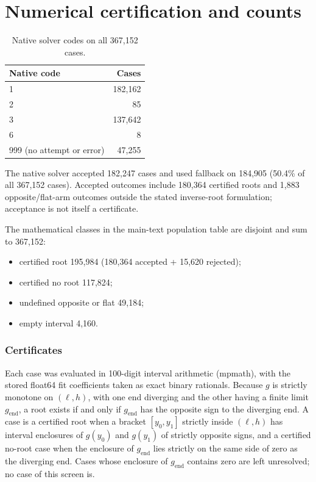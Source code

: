 \documentclass[11pt]{article}
\begin{document}
\section{Numerical certification and counts}\label{sec:S10}
\begin{table}[htbp]
\caption{Native solver codes on all 367,152 cases.}\label{tab:S10}
\centering\small
\begin{tabularx}{0.5\linewidth}{@{}L r@{}}
\toprule
Native code & Cases \\
 & 182,162 \\
2 & 85 \\
3 & 137,642 \\
6 & 8 \\
999 (no attempt or error) & 47,255 \\
\bottomrule
\end{tabularx}
\end{table}
The native solver accepted 182,247 cases and used fallback on 184,905 (50.4\% of all 367,152 cases). Accepted outcomes include 180,364 certified roots and 1,883 opposite/flat-arm outcomes outside the stated inverse-root formulation; acceptance is not itself a certificate.

The mathematical classes in the main-text population table are disjoint and sum to 367,152:

\begin{itemize}
\item certified root 195,984 (180,364 accepted + 15,620 rejected);
\item certified no root 117,824;
\item undefined opposite or flat 49,184;
\item empty interval 4,160.
\end{itemize}

\subsubsection*{Certificates} Each case was evaluated in 100-digit interval arithmetic (mpmath), with the stored float64 fit coefficients taken as exact binary rationals. Because $g$ is strictly monotone on $(\ell,h)$, with one end diverging and the other having a finite limit $g_{\mathrm{end}}$, a root exists if and only if $g_{\mathrm{end}}$ has the opposite sign to the diverging end. A case is a certified root when a bracket $[y_0,y_1]$ strictly inside $(\ell,h)$ has interval enclosures of $g(y_0)$ and $g(y_1)$ of strictly opposite signs, and a certified no-root case when the enclosure of $g_{\mathrm{end}}$ lies strictly on the same side of zero as the diverging end. Cases whose enclosure of $g_{\mathrm{end}}$ contains zero are left unresolved; no case of this screen is.
\end{document}
